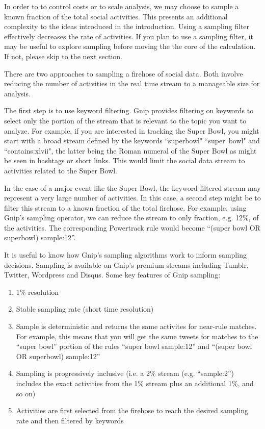 \documentclass{article}
\begin{document}
In order to to control costs or to scale analysis, we may choose to sample a known fraction of the total social activities. This presents an
additional complexity to the ideas introduced in the introduction. Using a sampling filter effectively decreases the rate of activities. If you
plan to use a sampling filter, it may be useful to explore sampling before moving the the core of the calculation.  
If not, please skip to the next section.

There are two approaches to sampling a firehose of social data. Both involve reducing the number of activities in the 
real time stream to a manageable size for analysis.

The first step is to use keyword filtering.  Gnip provides filtering on keywords to select only the portion of the stream
that is relevant to the topic you want to analyze. For example, if you are interested in tracking the Super Bowl, you 
might start with a broad stream defined by the keywords ``superbowl" ``super~bowl" and ``contains:xlvii", the 
latter being the Roman numeral of the Super Bowl as might be seen in hashtags or short links. This would limit the 
social data stream to activities related to the Super Bowl.

In the case of a major event like the Super Bowl, the keyword-filtered stream may represent a very large number
of activities.  In this case, a second step might be to filter this stream to a known fraction of the total firehose. For 
example, using Gnip's sampling operator, we can reduce the stream to only fraction, e.g. 12\%, of the activities. 
The corresponding Powertrack rule would become  ``(super bowl OR superbowl) sample:12''.

It is useful to know how Gnip's sampling algorithms work to inform sampling decisions.  Sampling is available on
Gnip's premium streams including Tumblr, Twitter, Wordpress and Disqus. Some key features of Gnip sampling:

\begin{enumerate}
	\item 1\% resolution
	\item Stable sampling rate (short time resolution)
	\item Sample is deterministic and returns the same activites for near-rule matches.  For example, this means
	that you will get the same tweets for matches to the ``super bowl'' portion of the rules ``super bowl sample:12'' 
	and ``(super bowl OR superbowl) sample:12''
	\item Sampling is progressively inclusive (i.e. a 2\% stream (e.g. ``sample:2'') includes the exact activities from the 1\% stream plus an 
	additional 1\%,  and so on)
	\item Activities are first selected from the firehose to reach the desired sampling rate and then filtered by keywords 
\end{enumerate}
\end{document}

